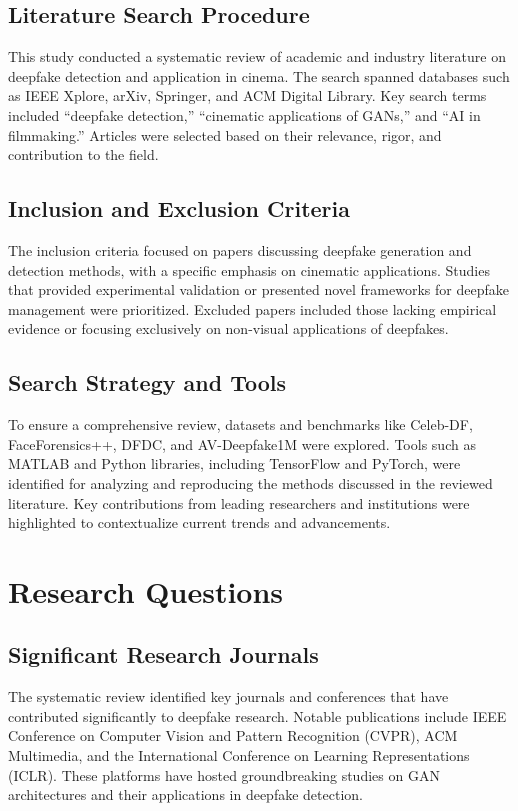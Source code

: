 \documentclass[12pt]{article}
\begin{document}
\subsection{Literature Search Procedure}
This study conducted a systematic review of academic and industry literature on deepfake detection and application in cinema. The search spanned databases such as IEEE Xplore, arXiv, Springer, and ACM Digital Library. Key search terms included “deepfake detection,” “cinematic applications of GANs,” and “AI in filmmaking.” Articles were selected based on their relevance, rigor, and contribution to the field.

\subsection{Inclusion and Exclusion Criteria}
The inclusion criteria focused on papers discussing deepfake generation and detection methods, with a specific emphasis on cinematic applications. Studies that provided experimental validation or presented novel frameworks for deepfake management were prioritized. Excluded papers included those lacking empirical evidence or focusing exclusively on non-visual applications of deepfakes.

\subsection{Search Strategy and Tools}
To ensure a comprehensive review, datasets and benchmarks like Celeb-DF, FaceForensics++, DFDC, and AV-Deepfake1M were explored. Tools such as MATLAB and Python libraries, including TensorFlow and PyTorch, were identified for analyzing and reproducing the methods discussed in the reviewed literature. Key contributions from leading researchers and institutions were highlighted to contextualize current trends and advancements.

\section{Research Questions}
\subsection{Significant Research Journals}
The systematic review identified key journals and conferences that have contributed significantly to deepfake research. Notable publications include IEEE Conference on Computer Vision and Pattern Recognition (CVPR), ACM Multimedia, and the International Conference on Learning Representations (ICLR). These platforms have hosted groundbreaking studies on GAN architectures and their applications in deepfake detection.
\end{document}
